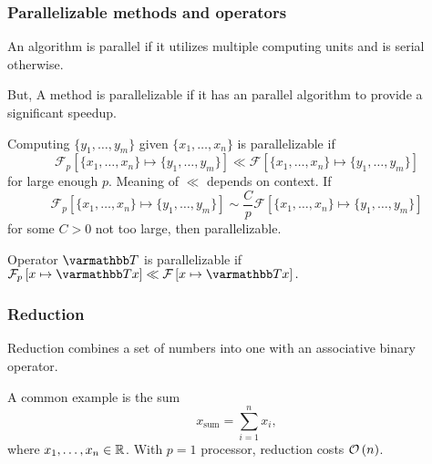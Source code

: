 \documentclass[10pt,mathserif]{beamer}
\begin{document}
\begin{frame}[plain]
\frametitle{Parallelizable methods and operators}
An algorithm is parallel if it utilizes multiple computing units and is serial otherwise.\pause

But, A method is parallelizable if it has an parallel algorithm to provide a significant speedup.

\vspace{0.2in}\pause
Computing $\{y_1,\dots,y_m\}$ given $\{x_1,\dots,x_n\}$ is parallelizable if
\[
\mathcal{F}_p\left[\{x_1,\dots,x_n\}\mapsto\{y_1,\dots,y_m\}\right]
\ll
\mathcal{F}\left[\{x_1,\dots,x_n\}\mapsto\{y_1,\dots,y_m\}\right]
\]
for large enough $p$.
Meaning of $\ll$ depends on context. \pause If
\[
\mathcal{F}_p\left[\{x_1,\dots,x_n\}\mapsto\{y_1,\dots,y_m\}\right]
\sim \frac{C}{p}
\mathcal{F}\left[\{x_1,\dots,x_n\}\mapsto\{y_1,\dots,y_m\}\right]
\]
for some $C>0$ not too large, then parallelizable.

\vspace{0.2in}\pause
Operator $\opT$ is parallelizable if
$
\mathcal{F}_p\left[x\mapsto \opT x\right]
\ll
\mathcal{F}\left[x\mapsto \opT x\right].
$

\end{frame}

\begin{frame}[fragile]
\frametitle{Reduction}
Reduction combines a set of numbers into one with an associative binary operator.

\vspace{0.2in}\pause
A common example is the sum
\[
    x_\mathrm{sum} = \sum_{i=1}^nx_i,
\]
where $x_1,\dots,x_n\in\mathbb{R}$.
With $p=1$ processor, reduction costs ${\mathcal{O}\left(n\right)}$.
\end{frame}
\end{document}

